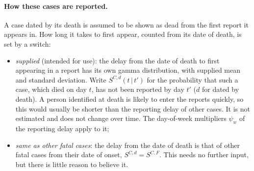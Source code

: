 \documentclass[11pt,a4paper]{article}
\newcommand{\given}{\,|\,}
\begin{document}
\paragraph{How these cases are reported.} A case dated by its death is
assumed to be shown as dead from the first report it appears in. How long
it takes to first appear, counted from its date of death, is set by a
switch:
\begin{itemize}
\item \emph{supplied} (intended for use): the delay from the date of death
to first appearing in a report has its own gamma distribution, with supplied
mean and standard deviation. Write $S^{C,d}(t\given t')$ for the
probability that such a case, which died on day $t$, has not been reported
by day $t'$ ($d$ for dated by death). A person
identified at death is likely to enter the reports quickly, so this would
usually be shorter than the reporting delay of other cases. It is not
estimated and does not change over time. The day-of-week multipliers
$\psi_w$ of the reporting delay apply to it;
\item \emph{same as other fatal cases}: the delay from the date of death is
that of other fatal cases from their date of onset, $S^{C,d}=S^{C,F}$.
This needs no further input, but there is little reason to believe it.
\end{itemize}
\end{document}
